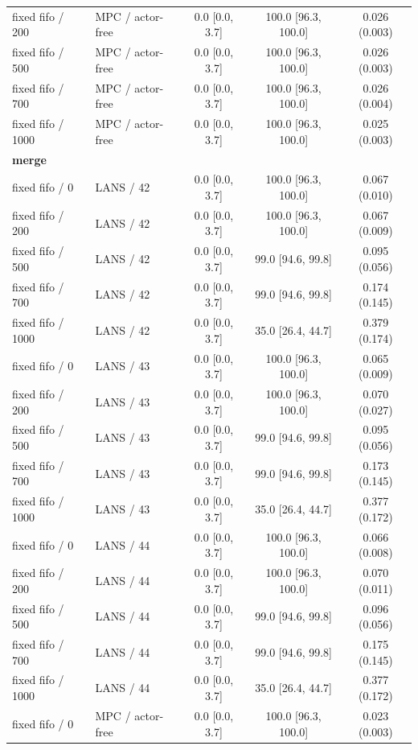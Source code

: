 \begin{longtable}{llccc}
fixed fifo / 200 & MPC / actor-free & 0.0 [0.0, 3.7] & 100.0 [96.3, 100.0] & 0.026 (0.003) \\
fixed fifo / 500 & MPC / actor-free & 0.0 [0.0, 3.7] & 100.0 [96.3, 100.0] & 0.026 (0.003) \\
fixed fifo / 700 & MPC / actor-free & 0.0 [0.0, 3.7] & 100.0 [96.3, 100.0] & 0.026 (0.004) \\
fixed fifo / 1000 & MPC / actor-free & 0.0 [0.0, 3.7] & 100.0 [96.3, 100.0] & 0.025 (0.003) \\
\multicolumn{5}{l}{\textbf{merge}} \\
fixed fifo / 0 & LANS / 42 & 0.0 [0.0, 3.7] & 100.0 [96.3, 100.0] & 0.067 (0.010) \\
fixed fifo / 200 & LANS / 42 & 0.0 [0.0, 3.7] & 100.0 [96.3, 100.0] & 0.067 (0.009) \\
fixed fifo / 500 & LANS / 42 & 0.0 [0.0, 3.7] & 99.0 [94.6, 99.8] & 0.095 (0.056) \\
fixed fifo / 700 & LANS / 42 & 0.0 [0.0, 3.7] & 99.0 [94.6, 99.8] & 0.174 (0.145) \\
fixed fifo / 1000 & LANS / 42 & 0.0 [0.0, 3.7] & 35.0 [26.4, 44.7] & 0.379 (0.174) \\
fixed fifo / 0 & LANS / 43 & 0.0 [0.0, 3.7] & 100.0 [96.3, 100.0] & 0.065 (0.009) \\
fixed fifo / 200 & LANS / 43 & 0.0 [0.0, 3.7] & 100.0 [96.3, 100.0] & 0.070 (0.027) \\
fixed fifo / 500 & LANS / 43 & 0.0 [0.0, 3.7] & 99.0 [94.6, 99.8] & 0.095 (0.056) \\
fixed fifo / 700 & LANS / 43 & 0.0 [0.0, 3.7] & 99.0 [94.6, 99.8] & 0.173 (0.145) \\
fixed fifo / 1000 & LANS / 43 & 0.0 [0.0, 3.7] & 35.0 [26.4, 44.7] & 0.377 (0.172) \\
fixed fifo / 0 & LANS / 44 & 0.0 [0.0, 3.7] & 100.0 [96.3, 100.0] & 0.066 (0.008) \\
fixed fifo / 200 & LANS / 44 & 0.0 [0.0, 3.7] & 100.0 [96.3, 100.0] & 0.070 (0.011) \\
fixed fifo / 500 & LANS / 44 & 0.0 [0.0, 3.7] & 99.0 [94.6, 99.8] & 0.096 (0.056) \\
fixed fifo / 700 & LANS / 44 & 0.0 [0.0, 3.7] & 99.0 [94.6, 99.8] & 0.175 (0.145) \\
fixed fifo / 1000 & LANS / 44 & 0.0 [0.0, 3.7] & 35.0 [26.4, 44.7] & 0.377 (0.172) \\
fixed fifo / 0 & MPC / actor-free & 0.0 [0.0, 3.7] & 100.0 [96.3, 100.0] & 0.023 (0.003) \\

\end{longtable}
